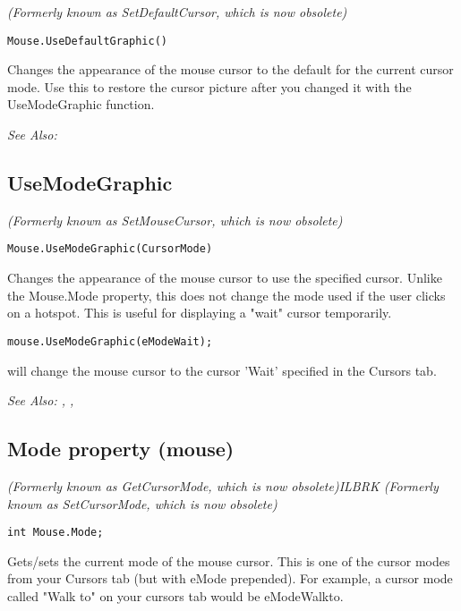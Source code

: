 \it{(Formerly known as SetDefaultCursor, which is now obsolete)}

\begin{verbatim}
Mouse.UseDefaultGraphic()
\end{verbatim}
Changes the appearance of the mouse cursor to the default for the current
cursor mode. Use this to restore the cursor picture after you changed it
with the UseModeGraphic function.

\it{See Also:} 


\subsection{UseModeGraphic}\label{Mouse.UseModeGraphic}%

\it{(Formerly known as SetMouseCursor, which is now obsolete)}

\begin{verbatim}
Mouse.UseModeGraphic(CursorMode)
\end{verbatim}
Changes the appearance of the mouse cursor to use the specified cursor. Unlike
the Mouse.Mode property, this does not change the mode used if the user
clicks on a hotspot. This is useful for displaying a "wait" cursor temporarily.

\begin{verbatim}
mouse.UseModeGraphic(eModeWait);
\end{verbatim}
will change the mouse cursor to the cursor 'Wait' specified in the Cursors tab.

\it{See Also:} ,
, 


\subsection{Mode property (mouse)}\label{Mouse.Mode}%

\it{(Formerly known as GetCursorMode, which is now obsolete)}ILBRK
\it{(Formerly known as SetCursorMode, which is now obsolete)}

\begin{verbatim}
int Mouse.Mode;
\end{verbatim}
Gets/sets the current mode of the mouse cursor. This is one of the cursor modes
from your Cursors tab (but with eMode prepended). For example, a cursor mode called "Walk to"
on your cursors tab would be  eModeWalkto.

